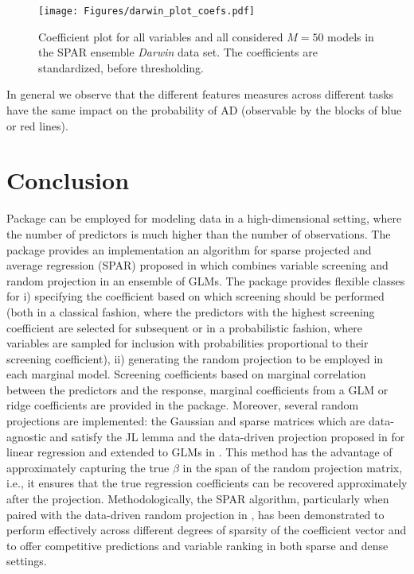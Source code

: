 \documentclass[
  article,
  nojss]{jss}
\begin{document}
\begin{figure}[t!]
\centering
\texttt{[image: Figures/darwin\_plot\_coefs.pdf]}
\caption{Coefficient plot for all variables and all considered $M=50$ models in the SPAR ensemble
\emph{Darwin} data set. The coefficients are standardized, before thresholding. \label{fig:darwin_coefs}}
\end{figure}

In general we observe that the different features measures across
different tasks have the same impact on the probability of AD
(observable by the blocks of blue or red lines).

\section{Conclusion}\label{sec-conclusion}

Package  can be employed for modeling data in a
high-dimensional setting, where the number of predictors is much higher
than the number of observations. The package provides an implementation
an algorithm for sparse projected and average regression (SPAR) proposed
in \citet{parzer2024glms} which combines variable screening and random
projection in an ensemble of GLMs. The package provides flexible classes
for i) specifying the coefficient based on which screening should be
performed (both in a classical fashion, where the predictors with the
highest screening coefficient are selected for subsequent or in a
probabilistic fashion, where variables are sampled for inclusion with
probabilities proportional to their screening coefficient), ii)
generating the random projection to be employed in each marginal model.
Screening coefficients based on marginal correlation between the
predictors and the response, marginal coefficients from a GLM or ridge
coefficients are provided in the package. Moreover, several random
projections are implemented: the Gaussian and sparse matrices which are
data-agnostic and satisfy the JL lemma and the data-driven projection
proposed in \citet{parzer2024sparse} for linear regression and extended
to GLMs in \citet{parzer2024glms}. This method has the advantage of
approximately capturing the true \(\beta\) in the span of the random
projection matrix, i.e., it ensures that the true regression
coefficients can be recovered approximately after the projection.
Methodologically, the SPAR algorithm, particularly when paired with the
data-driven random projection in \citet{parzer2024glms}, has been
demonstrated to perform effectively across different degrees of sparsity
of the coefficient vector and to offer competitive predictions and
variable ranking in both sparse and dense settings.
\end{document}
